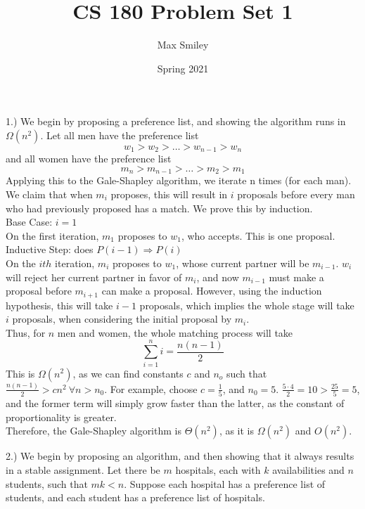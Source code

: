 \documentclass[12pt]{article}
\begin{document}
\title{CS 180 Problem Set 1}
\author{Max Smiley}
\date{Spring 2021}
\maketitle

1.) We begin by proposing a preference list, and showing the algorithm runs in $\Omega(n^2)$. Let all men have the preference list
$$w_1 > w_2 > \dots > w_{n - 1} > w_n$$
and all women have the preference list
$$m_n > m_{n - 1} > \dots > m_2 > m_1$$
Applying this to the Gale-Shapley algorithm, we iterate n times (for each man). We claim that when $m_i$ proposes, this will result in $i$ proposals before every man who had previously proposed has a match. We prove this by induction.\\


Base Case: $i = 1$\\
On the first iteration, $m_1$ proposes to $w_1$, who accepts. This is one proposal.\\


Inductive Step: does $P(i - 1) \Rightarrow P(i)$\\
On the $ith$ iteration, $m_i$ proposes to $w_1$, whose current partner will be $m_{i - 1}$. $w_i$ will reject her current partner in favor of $m_i$, and now $m_{i - 1}$ must make a proposal before $m_{i + 1}$ can make a proposal. However, using the induction hypothesis, this will take $i - 1$ proposals, which implies the whole stage will take $i$ proposals, when considering the initial proposal by $m_i$.\\

Thus, for $n$ men and women, the whole matching process will take
$$\sum_{i = 1}^ni = \frac{n(n - 1)}{2}$$
This is $\Omega(n^2)$, as we can find constants $c$ and $n_o$ such that $\frac{n (n - 1)}{2} > cn^2\ \forall n > n_0$. For example, choose $c = \frac{1}{5}$, and $n_0 = 5$. $\frac{5 \cdot 4}{2} = 10 > \frac{25}{5} = 5$, and the former term will simply grow faster than the latter, as the constant of proportionality is greater.\\

Therefore, the Gale-Shapley algorithm is $\Theta(n^2)$, as it is $\Omega(n^2)$ and $O(n^2)$.

 \pagebreak 

2.) We begin by proposing an algorithm, and then showing that it always results in a stable assignment. Let there be $m$ hospitals, each with $k$ availabilities and $n$ students, such that $mk < n$. Suppose each hospital has a preference list of students, and each student has a preference list of hospitals.\\
\end{document}

